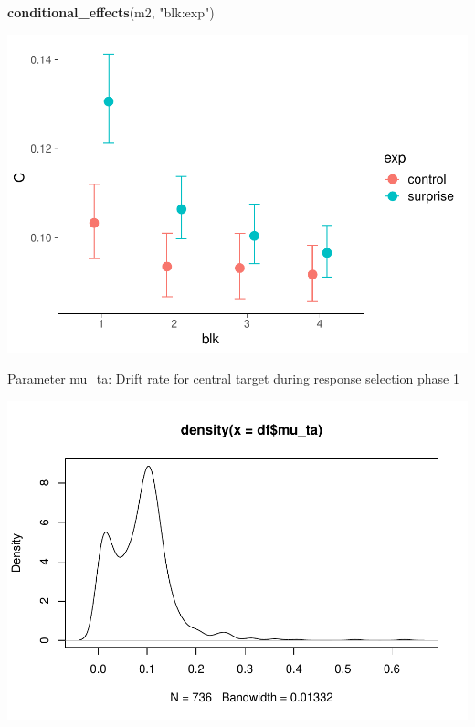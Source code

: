 \documentclass[
]{article}
\newenvironment{Shaded}{\begin{snugshade}}{\end{snugshade}}
\newcommand{\FunctionTok}[1]{\textcolor[rgb]{0.13,0.29,0.53}{\textbf{#1}}}
\newcommand{\NormalTok}[1]{#1}
\newcommand{\SpecialCharTok}[1]{\textcolor[rgb]{0.81,0.36,0.00}{\textbf{#1}}}
\newcommand{\StringTok}[1]{\textcolor[rgb]{0.31,0.60,0.02}{#1}}
\begin{document}
\begin{Shaded}
\begin{Highlighting}[]
\FunctionTok{conditional\_effects}\NormalTok{(m2, }\StringTok{"blk:exp"}\NormalTok{)}
\end{Highlighting}
\end{Shaded}

\includegraphics{params_analyses_files/figure-latex/unnamed-chunk-3-3.pdf}

Parameter mu\_ta: Drift rate for central target during response
selection phase 1

\begin{Shaded}
\end{Shaded}

\includegraphics{params_analyses_files/figure-latex/unnamed-chunk-4-1.pdf}
\end{document}
